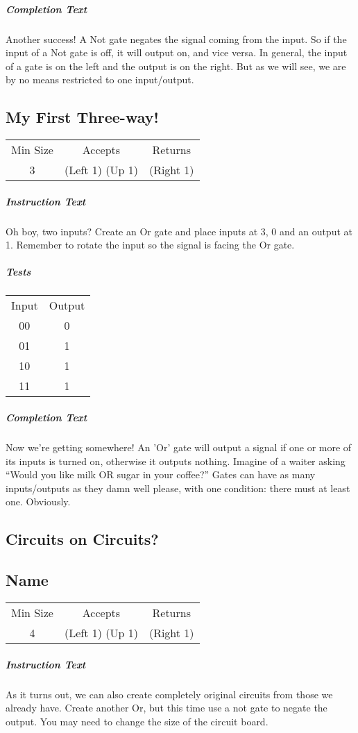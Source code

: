 \documentclass[a4paper, 12pt]{article}
\begin{document}
\subparagraph{Completion Text}
Another success! A Not gate negates the signal coming from the input. So if the input of a Not gate is off, it will output on, and vice versa. In general, the input of a gate is on the left and the output is on the right. But as we will see, we are by no means restricted to one input/output.
\subsection{My First Three-way!}
\begin{tabular}{ccc}
	Min Size & Accepts & Returns \\ 
	3 & (Left 1) (Up 1) & (Right 1)
\end{tabular}

\subparagraph{Instruction Text}
Oh boy, two inputs? Create an Or gate and place inputs at 3, 0 and an output at 1. Remember to rotate the input so the signal is facing the Or gate.

\subparagraph{Tests}
\begin{tabular}{cc}
	Input & Output  \\
	00 & 0 \\
	01 & 1 \\
	10 & 1 \\
	11 & 1
\end{tabular}

\subparagraph{Completion Text}		
Now we're getting somewhere! An 'Or' gate will output a signal if one or more of its inputs is turned on, otherwise it outputs nothing. Imagine of a waiter asking “Would you like milk OR sugar in your coffee?” Gates can have as many inputs/outputs as they damn well please, with one condition: there must at least one. Obviously.
\subsection{Circuits on Circuits?}
\subsection{Name}
\begin{tabular}{ccc}
	Min Size & Accepts & Returns \\
	4 & (Left 1) (Up 1) & (Right 1)
\end{tabular}

\subparagraph{Instruction Text}
As it turns out, we can also create completely original circuits from those we already have. Create another Or, but this time use a not gate to negate the output. You may need to change the size of the circuit board.
\end{document}
